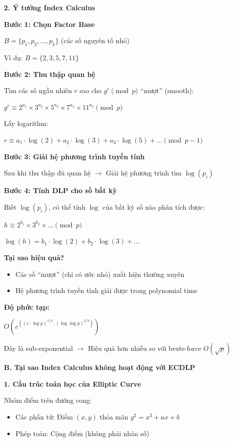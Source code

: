 \textbf{2. Ý tưởng Index Calculus}

\textbf{Bước 1: Chọn Factor Base}

$B = \{p_1, p_2, \ldots, p_k\}$ (các số nguyên tố nhỏ)

Ví dụ: $B = \{2, 3, 5, 7, 11\}$

\textbf{Bước 2: Thu thập quan hệ}

Tìm các số ngẫu nhiên $r$ sao cho $g^r \pmod{p}$ ``mượt'' (smooth):

$g^r \equiv 2^{a_1} \times 3^{a_2} \times 5^{a_3} \times 7^{a_4} \times 11^{a_5} \pmod{p}$

Lấy logarithm:

$r \equiv a_1 \cdot \log(2) + a_2 \cdot \log(3) + a_3 \cdot \log(5) + \ldots \pmod{p-1}$

\textbf{Bước 3: Giải hệ phương trình tuyến tính}

Sau khi thu thập đủ quan hệ $\rightarrow$ Giải hệ phương trình tìm $\log(p_i)$

\textbf{Bước 4: Tính DLP cho số bất kỳ}

Biết $\log(p_i)$, có thể tính $\log$ của bất kỳ số nào phân tích được:

$h \equiv 2^{b_1} \times 3^{b_2} \times \ldots \pmod{p}$

$\log(h) = b_1 \cdot \log(2) + b_2 \cdot \log(3) + \ldots$

\textbf{Tại sao hiệu quả?}
\begin{itemize}
    \item Các số ``mượt'' (chỉ có ước nhỏ) xuất hiện thường xuyên
    \item Hệ phương trình tuyến tính giải được trong polynomial time
\end{itemize}

\textbf{Độ phức tạp:}

$O(e^{((c \cdot \log p)^{1/3} \cdot (\log \log p)^{2/3})})$

Đây là sub-exponential $\rightarrow$ Hiệu quả hơn nhiều so với brute-force $O(\sqrt{p})$

\textbf{B. Tại sao Index Calculus không hoạt động với ECDLP}

\textbf{1. Cấu trúc toán học của Elliptic Curve}

Nhóm điểm trên đường cong:
\begin{itemize}
    \item Các phần tử: Điểm $(x, y)$ thỏa mãn $y^2 = x^3 + ax + b$
    \item Phép toán: Cộng điểm (không phải nhân số)
\end{itemize}


